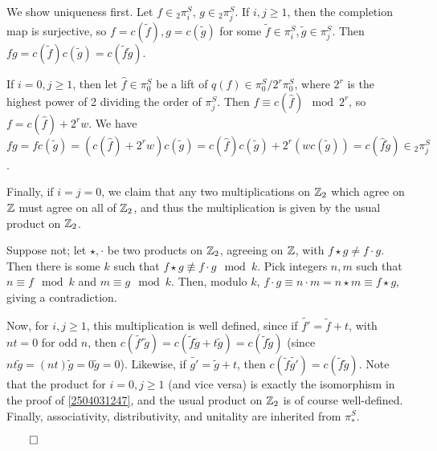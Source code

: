 \documentclass{MetricNotes2023}
\def\inte{\ensuremath\mathbb{Z}}
\def\done{\begin{flushright}\vspace{-4.35ex}\(\qed\)\end{flushright}}
\begin{document}
\begin{ourproof}
We show uniqueness first. Let \(f \in \text{}_2\pi_i^S\), \(g \in \text{}_2\pi_j^S\). If \(i,j \geq 1\), then the completion map is surjective, so \(f=c(\tilde f), g = c(\tilde g)\) for some \(\tilde f \in \pi_i^S, \tilde g \in \pi_j^S\). Then \(fg=c(\tilde f)c(\tilde g)=c(\tilde f \tilde g)\).

If \(i=0, j\geq 1\), then let \(\hat f\in \pi_0^S\) be a lift of \(q(f)\in \pi_0^S/2^r\pi_0^S\), where \(2^r\) is the highest power of 2 dividing the order of \(\pi_j^S\). Then \(f\equiv c(\hat f) \mod 2^r\), so \(f=c(\hat f) + 2^rw\). We have \(fg=fc(\tilde g)=(c(\hat f) + 2^r w)c(\tilde g)=c(\hat f) c(\tilde g)+2^r(wc(\tilde g))=c(\hat f \tilde g)\in \text{}_2\pi_j^S\). 

Finally, if \(i=j=0\), we claim that any two multiplications on \(\inte_2\) which agree on \(\inte\) must agree on all of \(\inte_2\), and thus the multiplication is given by the usual product on \(\inte_2\). 

Suppose not; let \(\star, \cdot\) be two products on \(\inte_2\), agreeing on \(\inte\), with \(f\star g \neq f \cdot g\). Then there is some \(k\) such that \(f \star g \not\equiv f \cdot g \mod k\). Pick integers \(n, m\) such that \(n\equiv f \mod k\) and \(m \equiv g \mod k\). Then, modulo \(k\), \(f\cdot g \equiv n\cdot m =n\star m \equiv f \star g\), giving a contradiction.

Now, for \(i, j \geq 1\), this multiplication is well defined, since if \(\tilde{f'}=\tilde f+t\), with \(nt=0\) for odd \(n\), then \(c(\tilde{f'}\tilde g)=c(\tilde f \tilde g + t\tilde g)=c(\tilde f \tilde g)\) (since \(nt\tilde g=(nt)\tilde g = 0\tilde g = 0\)). Likewise, if \(\tilde{g'}=\tilde g + t\), then \(c(\tilde f \tilde{g'})=c(\tilde f \tilde g)\). Note that the product for \(i=0, j \geq 1\)  (and vice versa) is exactly the isomorphism in the proof of \ref{2504031247}, and the usual product on \(\inte_2\) is of course well-defined. Finally, associativity, distributivity, and unitality are inherited from \(\pi_*^S\). \done
\end{ourproof}
\end{document}
